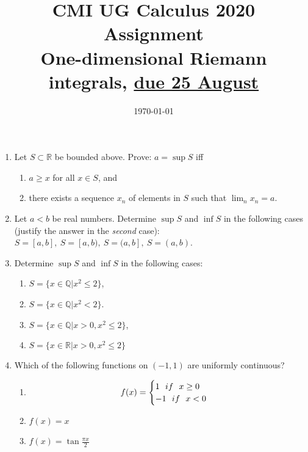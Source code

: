 \documentclass[11pt]{amsart}
\newcommand{\bbQ}{\mathbb{Q}}
\newcommand{\bbR}{\mathbb{R}}
\theoremstyle{definition}
\begin{document}
\title{CMI UG Calculus 2020 Assignment\\
 {\tiny One-dimensional Riemann integrals, \underline{due 25 August}}}
\date{\today}
\maketitle




\begin{enumerate}[wide, labelwidth=!, labelindent=0pt]
\item Let $S \subset \bbR$ be bounded above. Prove: $a = \sup S$ iff 
\begin{enumerate}[label=(\alph*)]
\item $a \ge x$ for all $x \in S$, and
\item there exists a sequence $x_n$ of elements in $S$ such that $\lim_n x_n=a$. 
\end{enumerate}

\item  Let $a<b$ be real numbers. Determine $\sup S$ and $\inf S$ in the following cases (justify the answer in the \emph{second} case): $S=[a,b],\  S=[a,b),\ S=(a,b],\ S=(a,b)$. 

\item Determine $\sup S$ and $\inf S$ in the following cases: 
\begin{enumerate}[label=(\alph*)]
\item $S=\{x \in \bbQ|x^2 \le 2\}$,
\item $S=\{x \in \bbQ|x^2 < 2\}$.
\item $S=\{x \in \bbQ|x > 0, x^2 \le 2\}$,
\item $S=\{x \in \bbR|x > 0, x^2 \le 2\}$
\end{enumerate}
 

\item Which of the following functions on $(-1,1)$ are uniformly continuous? 

\begin{enumerate}[label=(\alph*)]
\item \[
f(x)=
\begin{cases}
1\ \ if \ \ \textup{$x \ge 0$}\\
-1 \ \ if \ \ \textup{$x < 0$}
\end{cases}
\]
\item $f(x)=x$
\item $f(x)=\tan \frac{\pi x}{2}$
\end{enumerate}




\end{enumerate}
\end{document}
